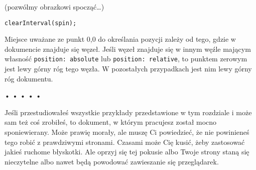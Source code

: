  
(pozwólmy obrazkowi spocząć…)

  
\begin{verbatim} 
clearInterval(spin);
\end{verbatim}
  
Miejsce uważane ze punkt 0,0 do określania pozycji zależy od tego, gdzie w dokumencie znajduje się węzeł. Jeśli węzeł znajduje się w innym węźle mającym własność \texttt{position: absolute} lub \texttt{position: relative}, to punktem zerowym jest lewy górny róg tego węzła. W pozostałych przypadkach jest nim lewy górny róg dokumentu.



\begin{center}
• • • • •
\end{center}

  
Jeśli przestudiowałeś wszystkie przykłady przedstawione w tym rozdziale i może sam też coś zrobiłeś, to dokument, w którym pracujesz został mocno sponiewierany. Może prawię morały, ale muszę Ci powiedzieć, że nie powinieneś tego robić z prawdziwymi stronami. Czasami może Cię kusić, żeby zastosować jakieś ruchome błyskotki. Ale oprzyj się tej pokusie albo Twoje strony staną się nieczytelne albo nawet będą powodować zawieszanie się przeglądarek.